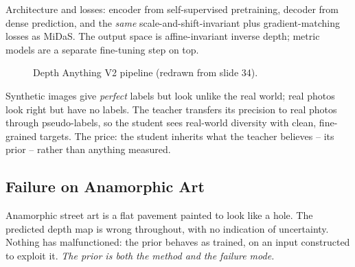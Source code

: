 \documentclass[11pt,a4paper]{article}
\theoremstyle{definition}
\theoremstyle{plain}
\theoremstyle{remark}
\begin{document}
Architecture and losses: encoder from self-supervised pretraining, decoder from dense prediction, and the \emph{same} scale-and-shift-invariant plus gradient-matching losses as MiDaS. The output space is affine-invariant inverse depth; metric models are a separate fine-tuning step on top.
 
\begin{figure}[htbp]
\centering
{}
\caption{Depth Anything V2 pipeline (redrawn from slide 34).}
\end{figure}
 
\begin{intuition}
Synthetic images give \emph{perfect} labels but look unlike the real world; real photos look right but have no labels. The teacher transfers its precision to real photos through pseudo-labels, so the student sees real-world diversity with clean, fine-grained targets. The price: the student inherits what the teacher believes -- its prior -- rather than anything measured.
\end{intuition}
 
\subsection{Failure on Anamorphic Art }
 
Anamorphic street art is a flat pavement painted to look like a hole. The predicted depth map is wrong throughout, with no indication of uncertainty. Nothing has malfunctioned: the prior behaves as trained, on an input constructed to exploit it. \emph{The prior is both the method and the failure mode.}
\end{document}
